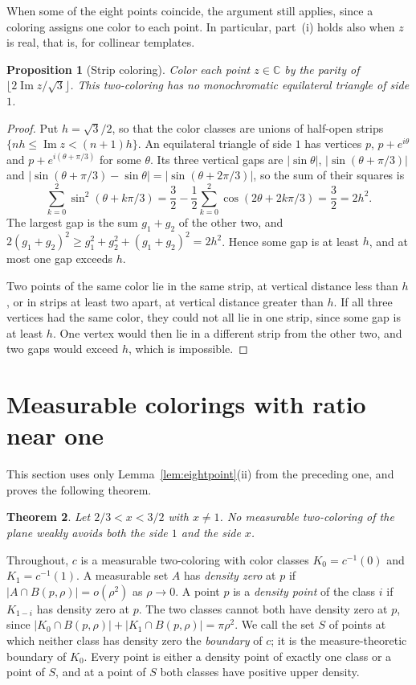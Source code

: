 \documentclass[10pt]{article}
\newtheorem{thm}{Theorem}[section]
\newtheorem{prop}[thm]{Proposition}
\theoremstyle{remark}
\newcommand{\C}{\mathbb C}
\DeclareMathOperator{\im}{Im}
\begin{document}
When some of the eight points coincide, the argument still applies, since a coloring assigns one color to each point. In particular, part~(i) holds also when $z$ is real, that is, for collinear templates.

\begin{prop}[Strip coloring]\label{prop:strips}
Color each point $z\in\C$ by the parity of $\lfloor 2\im z/\sqrt3\rfloor$. This two-coloring has no monochromatic equilateral triangle of side $1$.
\end{prop}

\begin{proof}
Put $h=\sqrt3/2$, so that the color classes are unions of half-open strips $\{nh\le\im z<(n+1)h\}$. An equilateral triangle of side $1$ has vertices $p$, $p+e^{i\theta}$ and $p+e^{i(\theta+\pi/3)}$ for some $\theta$. Its three vertical gaps are $|\sin\theta|$, $|\sin(\theta+\pi/3)|$ and $|\sin(\theta+\pi/3)-\sin\theta|=|\sin(\theta+2\pi/3)|$, so the sum of their squares is
\[
 \sum_{k=0}^2\sin^2(\theta+k\pi/3)=\frac32-\frac12\sum_{k=0}^2\cos(2\theta+2k\pi/3)=\frac32=2h^2.
\]
The largest gap is the sum $g_1+g_2$ of the other two, and $2(g_1+g_2)^2\ge g_1^2+g_2^2+(g_1+g_2)^2=2h^2$. Hence some gap is at least $h$, and at most one gap exceeds $h$.

Two points of the same color lie in the same strip, at vertical distance less than $h$, or in strips at least two apart, at vertical distance greater than $h$. If all three vertices had the same color, they could not all lie in one strip, since some gap is at least $h$. One vertex would then lie in a different strip from the other two, and two gaps would exceed $h$, which is impossible.
\end{proof}

\section{Measurable colorings with ratio near one}\label{sec:circle}

This section uses only Lemma~\ref{lem:eightpoint}(ii) from the preceding one, and proves the following theorem.

\begin{thm}\label{thm:circle}
Let $2/3<x<3/2$ with $x\ne1$. No measurable two-coloring of the plane weakly avoids both the side $1$ and the side $x$.
\end{thm}

Throughout, $c$ is a measurable two-coloring with color classes $K_0=c^{-1}(0)$ and $K_1=c^{-1}(1)$. A measurable set $A$ has \emph{density zero} at $p$ if $|A\cap B(p,\rho)|=o(\rho^2)$ as $\rho\to0$. A point $p$ is a \emph{density point} of the class $i$ if $K_{1-i}$ has density zero at $p$. The two classes cannot both have density zero at $p$, since $|K_0\cap B(p,\rho)|+|K_1\cap B(p,\rho)|=\pi\rho^2$. We call the set $S$ of points at which neither class has density zero the \emph{boundary} of $c$; it is the measure-theoretic boundary of $K_0$. Every point is either a density point of exactly one class or a point of $S$, and at a point of $S$ both classes have positive upper density.
\end{document}
